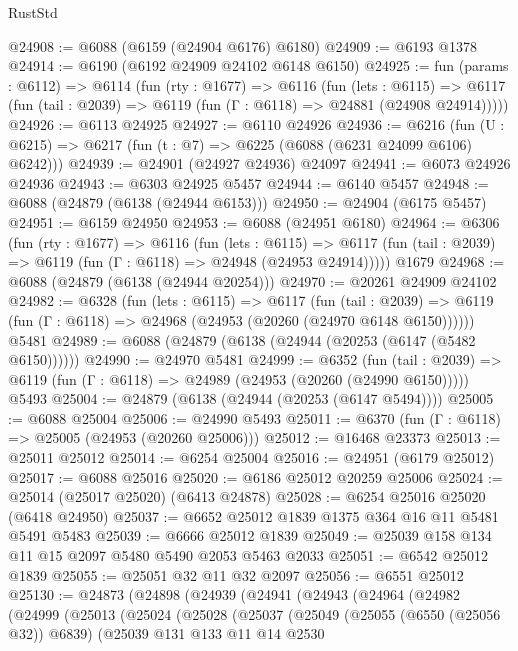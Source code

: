 \begin{lexlean}{RustStd}
\begin{coremodule}
@24908 := @6088 (@6159 (@24904 @6176) @6180)
@24909 := @6193 @1378
@24914 := @6190 (@6192 @24909 @24102 @6148 @6150)
@24925 := fun (params : @6112) =>
  @6114
    (fun (rty : @1677) =>
    @6116
      (fun (lets : @6115) =>
      @6117 (fun (tail : @2039) => @6119 (fun (Γ : @6118) => @24881 (@24908 @24914)))))
@24926 := @6113 @24925
@24927 := @6110 @24926
@24936 := @6216
    (fun (U : @6215) => @6217 (fun (t : @7) => @6225 (@6088 (@6231 @24099 @6106) @6242)))
@24939 := @24901 (@24927 @24936) @24097
@24941 := @6073 @24926 @24936
@24943 := @6303 @24925 @5457
@24944 := @6140 @5457
@24948 := @6088 (@24879 (@6138 (@24944 @6153)))
@24950 := @24904 (@6175 @5457)
@24951 := @6159 @24950
@24953 := @6088 (@24951 @6180)
@24964 := @6306
    (fun (rty : @1677) =>
    @6116
      (fun (lets : @6115) =>
      @6117 (fun (tail : @2039) => @6119 (fun (Γ : @6118) => @24948 (@24953 @24914)))))
    @1679
@24968 := @6088 (@24879 (@6138 (@24944 @20254)))
@24970 := @20261 @24909 @24102
@24982 := @6328
    (fun (lets : @6115) =>
    @6117
      (fun (tail : @2039) =>
      @6119 (fun (Γ : @6118) => @24968 (@24953 (@20260 (@24970 @6148 @6150))))))
    @5481
@24989 := @6088 (@24879 (@6138 (@24944 (@20253 (@6147 (@5482 @6150))))))
@24990 := @24970 @5481
@24999 := @6352
    (fun (tail : @2039) => @6119 (fun (Γ : @6118) => @24989 (@24953 (@20260 (@24990 @6150)))))
    @5493
@25004 := @24879 (@6138 (@24944 (@20253 (@6147 @5494))))
@25005 := @6088 @25004
@25006 := @24990 @5493
@25011 := @6370 (fun (Γ : @6118) => @25005 (@24953 (@20260 @25006)))
@25012 := @16468 @23373
@25013 := @25011 @25012
@25014 := @6254 @25004
@25016 := @24951 (@6179 @25012)
@25017 := @6088 @25016
@25020 := @6186 @25012 @20259 @25006
@25024 := @25014 (@25017 @25020) (@6413 @24878)
@25028 := @6254 @25016 @25020 (@6418 @24950)
@25037 := @6652 @25012 @1839 @1375 @364 @16 @11 @5481 @5491 @5483
@25039 := @6666 @25012 @1839
@25049 := @25039 @158 @134 @11 @15 @2097 @5480 @5490 @2053 @5463 @2033
@25051 := @6542 @25012 @1839
@25055 := @25051 @32 @11 @32 @2097
@25056 := @6551 @25012
@25130 := @24873
    (@24898
      (@24939
        (@24941
          (@24943
            (@24964
              (@24982
                (@24999
                  (@25013
                    (@25024
                      (@25028
                        (@25037
                          (@25049
                            (@25055 (@6550 (@25056 @32)) @6839)
                            (@25039
                              @131
                              @133
                              @11
                              @14
                              @2530

\end{coremodule}
\end{lexlean}
